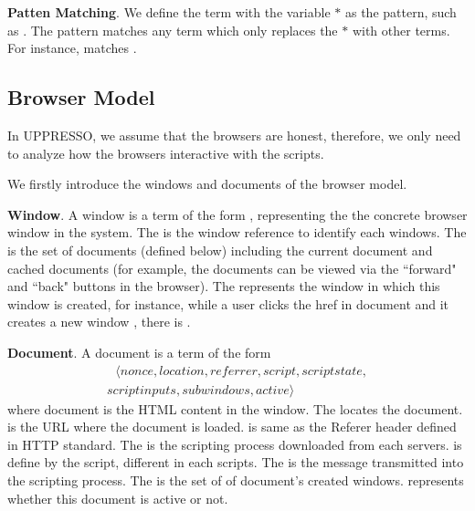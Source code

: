 \begin{appendices}
\vspace{1mm}\noindent\textbf{Patten Matching}.  We define the term with the variable $*$ as the pattern, such as . 
The pattern matches any term which only replaces the $*$ with other terms. For instance,   matches .

\subsection{Browser Model}
In UPPRESSO, we assume that the browsers are honest, therefore, we only need to analyze how the browsers interactive with the scripts.

We firstly introduce the windows and documents of the browser model.

\vspace{1mm}\noindent\textbf{Window}. A window  is a term of the form , representing the  the concrete browser window in the system. The  is the window reference to identify each windows. The  is the set of documents (defined below) including the current document and cached documents (for example, the documents can be viewed via the ``forward" and ``back" buttons in the browser). The  represents the window in which this window is created, for instance, while a user clicks the href in document  and it creates a new window , there is .

\vspace{1mm}\noindent\textbf{Document}. A document  is a term of the form
\begin{multline*}
  \ \ \ \langle nonce, location, referrer, script, scriptstate, \\
  scriptinputs, subwindows, active \rangle \ \ \ 
\end{multline*}
where document is the HTML content in the window.  The  locates the document.  is the URL where the document is loaded.  is same as the Referer header defined in HTTP standard. The  is the scripting process downloaded from each servers.  is define by the script, different in each scripts. The  is the message transmitted into the scripting process. The  is the set of  of document's created windows.  represents whether this document is active or not.


\end{appendices}
